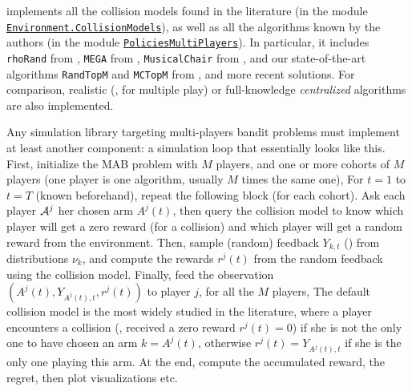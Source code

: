 \SMPyBandits{} implements all the collision models found in the literature (in the module \texttt{\href{https://SMPyBandits.GitHub.io/docs/Environment.CollisionModels.html}{Environment.CollisionModels}}), as well as all the algorithms known by the authors (in the module \texttt{\href{https://SMPyBandits.GitHub.io/docs/PoliciesMultiPlayers.html}{PoliciesMultiPlayers}}).
%
In particular, it includes
\texttt{rhoRand}
from \cite{Anandkumar11},
\texttt{MEGA}
from \cite{Avner15},
\texttt{MusicalChair}
from \cite{Rosenski16},
and our state-of-the-art algorithms
\texttt{RandTopM}
and \texttt{MCTopM}
from \cite{Besson2018ALT}, and more recent solutions.
For comparison, realistic (\eg, \UCB{} for multiple play) or full-knowledge \emph{centralized} algorithms are also implemented.

Any simulation library targeting multi-players bandit problems must implement at least another component:
a simulation loop that essentially looks like this.
    First, initialize the MAB problem with $M$ players, and one or more cohorts of $M$ players (one player is one algorithm, usually $M$ times the same one),
    For $t=1$ to $t=T$ (known beforehand), repeat the following block (for each cohort). Ask each player $\mathcal{A}^j$ her chosen arm $A^j(t)$, then query the collision model to know which player will get a zero reward (for a collision) and which player will get a random reward from the environment.
    Then, sample (random) feedback $Y_{k,t}$ (\iid) from distributions $\nu_{k}$, and compute the rewards $r^j(t)$ from the random feedback using the collision model.
    Finally, feed the observation $(A^j(t), Y_{A^j(t),t}, r^j(t))$ to player $j$, for all the $M$ players,
    The default collision model is the most widely studied in the literature, where a player encounters a collision (\ie, received a zero reward $r^j(t)=0$) if she is not the only one to have chosen an arm $k=A^j(t)$, otherwise $r^j(t)=Y_{A^j(t),t}$ if she is the only one playing this arm.
    At the end, compute the accumulated reward, the regret, then plot visualizations etc.


